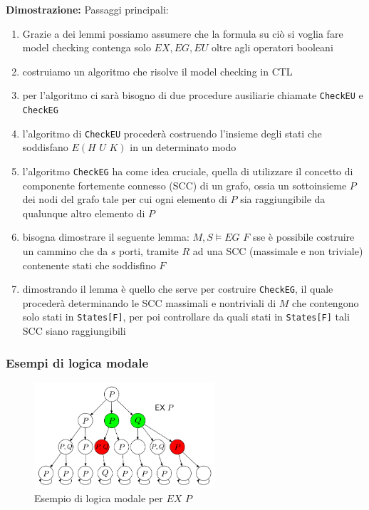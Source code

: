 \documentclass{article}
\begin{document}
\textbf{Dimostrazione:} Passaggi principali:
\begin{enumerate}
    \item Grazie a dei lemmi possiamo assumere che la formula su ciò si voglia fare model checking contenga solo $EX, EG, EU$ oltre agli operatori booleani
    \item costruiamo un algoritmo che risolve il model checking in CTL
    \item per l'algoritmo ci sarà bisogno di due procedure ausiliarie chiamate \verb|CheckEU| e \verb|CheckEG|
    \item l'algoritmo di \verb|CheckEU| procederà costruendo l'insieme degli stati che soddisfano $E(H\,\,U\,\,K)$ in un determinato modo
    \item l'algoritmo \verb|CheckEG| ha come idea cruciale, quella di utilizzare il concetto di componente fortemente connesso (SCC) di un grafo, ossia un sottoinsieme $P$ dei nodi del grafo tale per cui ogni elemento di $P$ sia raggiungibile da qualunque altro elemento di $P$
    \item bisogna dimostrare il seguente lemma: $M,S\vDash EG\,\,F$ sse è possibile costruire un cammino che da $s$ porti, tramite $R$ ad una SCC (massimale e non triviale) contenente stati che soddisfino $F$
    \item dimostrando il lemma è quello che serve per costruire \verb|CheckEG|, il quale procederà determinando le SCC massimali e nontriviali di $M$ che contengono solo stati in \verb|States[F]|, per poi controllare da quali stati in \verb|States[F]| tali SCC siano raggiungibili
\end{enumerate}



\subsubsection{Esempi di logica modale}

\begin{figure}[!ht]
    \centering
    \includegraphics[width=0.6\textwidth]{exp.png}
    \caption{Esempio di logica modale per $EX\,\, P$}
    \label{fig:exp}
\end{figure}
\end{document}
